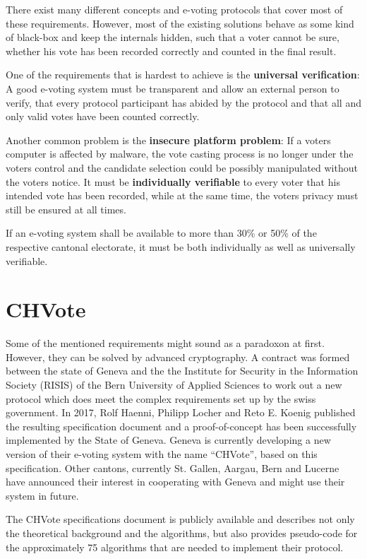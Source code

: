 There exist many different concepts and e-voting protocols that cover most of these requirements. However, most of the existing solutions behave as some kind of black-box and keep the internals hidden, such that a voter cannot be sure, whether his vote has been recorded correctly and counted in the final result. 

One of the requirements that is hardest to achieve is the \textbf{universal verification}: A good e-voting system must be transparent and allow an external person to verify, that every protocol participant has abided by the protocol and that all and only valid votes have been counted correctly.

Another common problem is the \textbf{insecure platform problem}: If a voters computer is affected by malware, the vote casting process is no longer under the voters control and the candidate selection could be possibly manipulated without the voters notice. It must be \textbf{individually verifiable} to every voter that his intended vote has been recorded, while at the same time, the voters privacy must still be ensured at all times. 

If an e-voting system shall be available to more than 30\% or 50\% of the respective cantonal electorate, it must be both individually as well as universally verifiable.

\section{CHVote}
Some of the mentioned requirements might sound as a paradoxon at first. However, they can be solved by advanced cryptography. A contract was formed between the state of Geneva and the the Institute for Security in the Information Society (RISIS) of the Bern University of Applied Sciences to work out a new protocol which does meet the complex requirements set up by the swiss government. In 2017, Rolf Haenni, Philipp Locher and Reto E. Koenig published the resulting specification document and a proof-of-concept has been successfully implemented by the State of Geneva. Geneva is currently developing a new version of their e-voting system with the name "`CHVote"', based on this specification. Other cantons, currently St. Gallen, Aargau, Bern and Lucerne have announced their interest in cooperating with Geneva and might use their system in future.

The CHVote specifications document is publicly available and describes not only the theoretical background and the algorithms, but also provides pseudo-code for the approximately 75 algorithms that are needed to implement their protocol.

